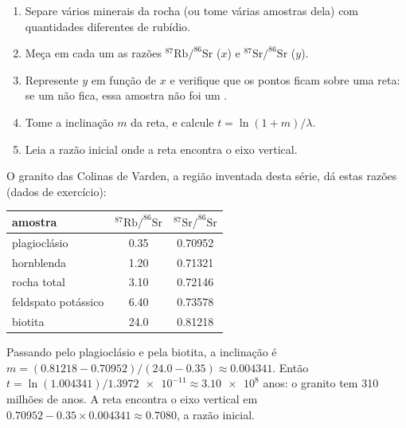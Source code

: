 \begin{method}\label{met:g12:age-of-the-earth:isochron}
\begin{enumerate}
  \item Separe vários minerais da rocha (ou tome várias amostras dela) com
        quantidades diferentes de rubídio.
  \item Meça em cada um as razões $^{87}\mathrm{Rb}/^{86}\mathrm{Sr}$ ($x$)
        e $^{87}\mathrm{Sr}/^{86}\mathrm{Sr}$ ($y$).
  \item Represente $y$ em função de $x$ e verifique que os pontos ficam
        sobre uma reta: se um não fica, essa amostra não foi um .
  \item Tome a inclinação $m$ da reta, e calcule $t = \ln(1+m)/\lambda$.
  \item Leia a razão inicial onde a reta encontra o eixo vertical.
\end{enumerate}
\end{method}

\begin{example}\label{ex:g12:age-of-the-earth:varden}
O granito das Colinas de Varden, a região inventada desta série, dá estas
razões (dados de exercício):
\begin{center}
\small
\begin{tabular}{|l|c|c|}
\hline
amostra & $^{87}\mathrm{Rb}/^{86}\mathrm{Sr}$ & $^{87}\mathrm{Sr}/^{86}\mathrm{Sr}$ \\
\hline
plagioclásio & 0.35 & 0.70952 \\
hornblenda  & 1.20 & 0.71321 \\
rocha total  & 3.10 & 0.72146 \\
feldspato potássico  & 6.40 & 0.73578 \\
biotita     & 24.0 & 0.81218 \\
\hline
\end{tabular}
\end{center}
Passando pelo plagioclásio e pela biotita, a inclinação é
$m = (0.81218 - 0.70952)/(24.0 - 0.35) \approx 0.004341$. Então
$t = \ln(1.004341)/\num{1.3972e-11} \approx \num{3.10e8}$ anos:
o granito tem 310 milhões de anos. A reta encontra o eixo vertical em
$0.70952 - 0.35 \times 0.004341 \approx 0.7080$, a razão inicial.
\end{example}

